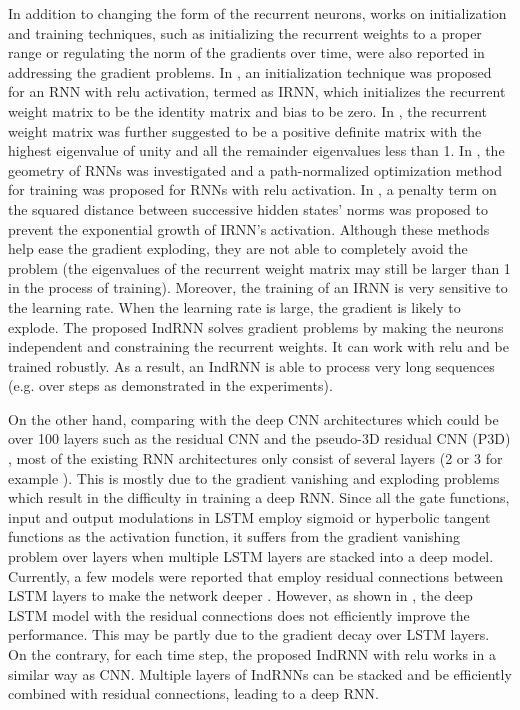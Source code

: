 \documentclass[10pt,twocolumn,letterpaper]{article}
\begin{document}
In addition to changing the form of the recurrent neurons, works on initialization and training techniques, such as initializing the recurrent weights to a proper range or regulating the norm of the gradients over time, were also reported in addressing the gradient problems. In \cite{le2015simple}, an initialization technique was proposed for an RNN with relu activation, termed as IRNN, which initializes the recurrent weight matrix to be the identity matrix and bias to be zero. In \cite{talathi2015improving}, the recurrent weight matrix was further suggested to be a positive definite matrix with the highest eigenvalue of unity and all the remainder eigenvalues less than 1. In \cite{neyshabur2016path}, the geometry of RNNs was investigated and a path-normalized optimization method for training was proposed for RNNs with relu activation. In \cite{krueger2016regularizing}, a penalty term on the squared distance between successive hidden states' norms was proposed to prevent the exponential growth of IRNN's activation. Although these methods help ease the gradient exploding, they are not able to completely avoid the problem (the eigenvalues of the recurrent weight matrix may still be larger than 1 in the process of training). Moreover, the training of an IRNN is very sensitive to the learning rate. When the learning rate is large, the gradient is likely to explode. The proposed IndRNN solves gradient problems by making the neurons independent and constraining the recurrent weights. It can work with relu and be trained robustly. As a result, an IndRNN is able to process very long sequences (e.g. over  steps as demonstrated in the experiments).

On the other hand, comparing with the deep CNN architectures which could be over 100 layers such as the residual CNN \cite{he2016deep} and the pseudo-3D residual CNN (P3D) \cite{qiu2017learning}, most of the existing RNN architectures only consist of several layers (2 or 3 for example \cite{krueger2016zoneout,shahroudy2016ntu,le2015simple}). This is mostly due to the gradient vanishing and exploding problems which result in the difficulty in training a deep RNN. Since all the gate functions, input and output modulations in LSTM employ sigmoid or hyperbolic tangent functions as the activation function, it suffers from the gradient vanishing problem over layers when multiple LSTM layers are stacked into a deep model. Currently, a few models were reported that employ residual connections \cite{he2016deep} between LSTM layers to make the network deeper \cite{wu2016google}. However, as shown in \cite{pradhanexploring}, the deep LSTM model with the residual connections does not efficiently improve the performance. This may be partly due to the gradient decay over LSTM layers. On the contrary, for each time step, the proposed IndRNN with relu works in a similar way as CNN. Multiple layers of IndRNNs can be stacked and be efficiently combined with residual connections, leading to a deep RNN.
\vspace{0.2cm}
\end{document}

